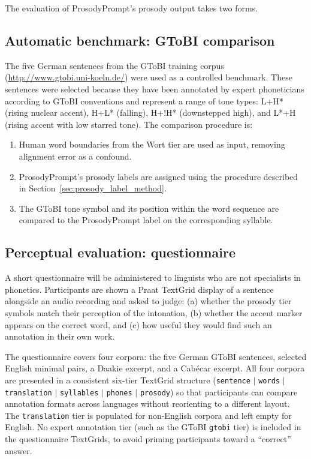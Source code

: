 The evaluation of ProsodyPrompt's prosody output takes two forms.

\subsection{Automatic benchmark: GToBI comparison}

The five German sentences from the GToBI training corpus
(\url{http://www.gtobi.uni-koeln.de/}) were used as a controlled benchmark.
These sentences were selected because they have been annotated by expert
phoneticians according to GToBI conventions and represent a range of tone types:
L+H* (rising nuclear accent), H+L* (falling), H+!H* (downstepped high), and
L*+H (rising accent with low starred tone). The comparison procedure is:
\begin{enumerate}
\item Human word boundaries from the Wort tier are used as input, removing
      alignment error as a confound.
\item ProsodyPrompt's prosody labels are assigned using the procedure described
      in Section~\ref{sec:prosody_label_method}.
\item The GToBI tone symbol and its position within the word sequence are
      compared to the ProsodyPrompt label on the corresponding syllable.
\end{enumerate}

\subsection{Perceptual evaluation: questionnaire}

A short questionnaire will be administered to linguists who are not specialists
in phonetics. Participants are shown a Praat TextGrid display of a sentence
alongside an audio recording and asked to judge: (a) whether the prosody tier
symbols match their perception of the intonation, (b) whether the accent marker
appears on the correct word, and (c) how useful they would find such an
annotation in their own work.

The questionnaire covers four corpora: the five German GToBI sentences,
selected English minimal pairs, a Daakie excerpt, and a Cabécar excerpt.
All four corpora are presented in a consistent six-tier TextGrid structure
(\texttt{sentence} $|$ \texttt{words} $|$ \texttt{translation} $|$
\texttt{syllables} $|$ \texttt{phones} $|$ \texttt{prosody}) so that
participants can compare annotation formats across languages without
reorienting to a different layout. The \texttt{translation} tier is populated
for non-English corpora and left empty for English. No expert annotation tier
(such as the GToBI \texttt{gtobi} tier) is included in the questionnaire
TextGrids, to avoid priming participants toward a ``correct'' answer.

